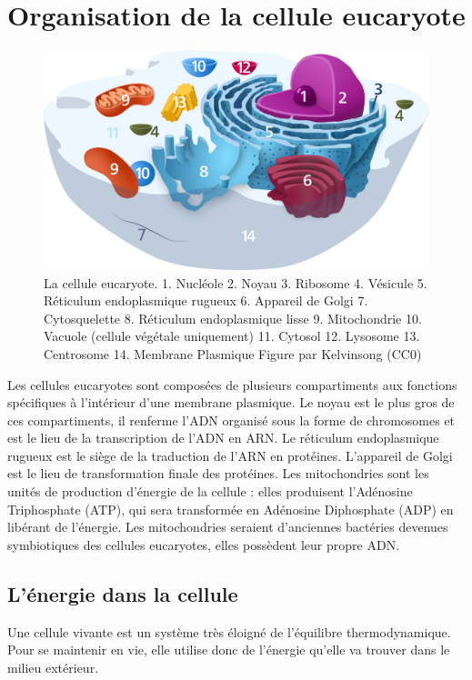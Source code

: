 \section{Organisation de la cellule eucaryote}
\begin{figure}[h!]
\includegraphics[scale=0.2]{Animal_Cell.png}
\caption{La cellule eucaryote. 
1. Nucléole
2. Noyau
3. Ribosome
4. Vésicule
5. Réticulum endoplasmique rugueux
6. Appareil de Golgi
7. Cytosquelette
8. Réticulum endoplasmique lisse
9. Mitochondrie
10. Vacuole (cellule végétale uniquement)
11. Cytosol
12. Lysosome
13. Centrosome
14. Membrane Plasmique
Figure par Kelvinsong (CC0)}
\end{figure}


Les cellules eucaryotes sont composées de plusieurs compartiments aux fonctions spécifiques à l'intérieur d'une membrane plasmique. Le noyau est le plus gros de ces compartiments, il renferme l'ADN organisé sous la forme de chromosomes et est le lieu de la transcription de l'ADN en ARN. 
Le réticulum endoplasmique rugueux est le siège de la traduction de l'ARN en protéines. 
L'appareil de Golgi est le lieu de transformation finale des protéines. 
Les mitochondries sont les unités de production d'énergie de la cellule : elles produisent l'Adénosine Triphosphate (ATP), qui sera transformée en Adénosine Diphosphate (ADP) en libérant de l'énergie. Les mitochondries seraient d'anciennes bactéries devenues symbiotiques des cellules eucaryotes, elles possèdent leur propre ADN. 

\subsection{L'énergie dans la cellule}

Une cellule vivante est un système très éloigné de l'équilibre thermodynamique. Pour se maintenir en vie, elle utilise donc de l'énergie qu'elle va trouver dans le milieu extérieur. 

